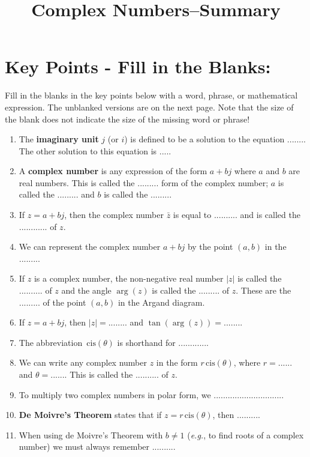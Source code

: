 \documentclass{article}
\newcommand{\cis}{\,\mathrm{cis}}
\begin{document}
\title{Complex Numbers--Summary}
\date{}

\maketitle
\thispagestyle{empty}
\pagestyle{empty}

\Large


\section{Key Points - Fill in the Blanks:}

Fill in the blanks in the key points below with a word, phrase, or mathematical expression. The unblanked versions are on the next page. Note that the size of the blank does not indicate the size of the missing word or phrase!

\begin{enumerate}
\item The \textbf{imaginary unit} $j$ (or $i$) is defined to be a solution to the equation ........ The other solution to this equation is .....
\item A \textbf{complex number} is any expression of the form $a+bj$ where $a$ and $b$ are real numbers. This is called the ......... form of the complex number; $a$ is called the ......... and $b$ is called the .........
\item If $z=a+bj$, then the complex number $\bar{z}$ is equal to .......... and is called the ............ of $z$.
\item We can represent the complex number $a+bj$ by the point $(a,b)$ in the .........
\item If $z$ is a complex number, the non-negative real number $|z|$ is called the .......... of $z$ and the angle $\arg(z)$ is called the ......... of $z$. These are the ......... of the point $(a,b)$ in the Argand diagram.
\item If $z=a+bj$, then $|z|=$........ and $\tan(\arg(z))=$........
\item The abbreviation $\cis(\theta)$ is shorthand for .............
\item We can write any complex number $z$ in the form $r\cis(\theta)$, where $r=$...... and $\theta=$....... This is called the .......... of $z$.
\item To multiply two complex numbers in polar form, we ..............................
\item \textbf{De Moivre's Theorem} states that if $z=r\cis(\theta)$, then ..........
\item When using de Moivre's Theorem with $b\neq 1$ (\textit{e.g.}, to find roots of a complex number) we must always remember ..........
\end{enumerate}
\end{document}
